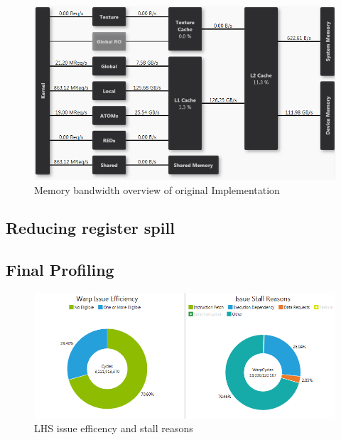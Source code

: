 \documentclass[11pt, oneside, a4paper]{article}
\begin{document}
\begin{figure}[tb]
	\begin{center}
		\includegraphics[width=\textwidth]{"Original nonconst LHS memory overview BW"}
	\end{center}
	\caption{Memory bandwidth overview of original Implementation}
	\label{fig:membBWorig}
\end{figure}


\subsection{Reducing register spill} %
\label{sub:reducing_register_spill}


\subsection{Final Profiling} %
\label{sub:final_profiling}

\begin{figure}[tb]
	\begin{center}
		\includegraphics[width=\textwidth]{"LHS efficency and stall reason"}
	\end{center}
	\caption{LHS issue efficency and stall reasons}
	\label{fig:issue_eff_and_stall_reasons}
\end{figure}
\end{document}
